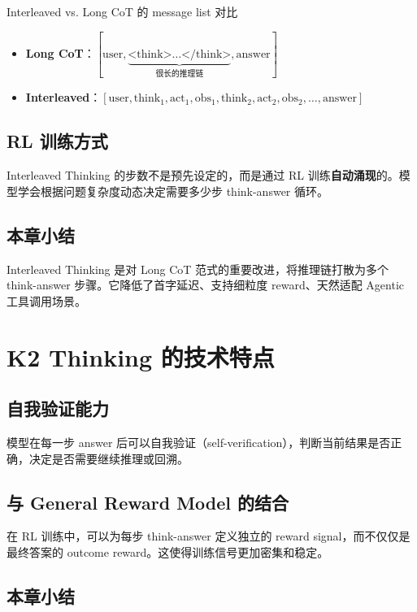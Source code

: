 \documentclass[a4paper]{article}
\begin{document}
\begin{knowledgebox}{Interleaved vs. Long CoT 的 message list 对比}
\begin{itemize}
  \item \textbf{Long CoT}：$[\text{user}, \underbrace{\text{<think>}\ldots\text{</think>}}_{\text{很长的推理链}}, \text{answer}]$
  \item \textbf{Interleaved}：$[\text{user}, \text{think}_1, \text{act}_1, \text{obs}_1, \text{think}_2, \text{act}_2, \text{obs}_2, \ldots, \text{answer}]$
\end{itemize}
\end{knowledgebox}

\subsection{RL 训练方式}

Interleaved Thinking 的步数不是预先设定的，而是通过 RL 训练\textbf{自动涌现}的。模型学会根据问题复杂度动态决定需要多少步 think-answer 循环。

\subsection{本章小结}

Interleaved Thinking 是对 Long CoT 范式的重要改进，将推理链打散为多个 think-answer 步骤。它降低了首字延迟、支持细粒度 reward、天然适配 Agentic 工具调用场景。

\section{K2 Thinking 的技术特点}

\subsection{自我验证能力}

模型在每一步 answer 后可以自我验证（self-verification），判断当前结果是否正确，决定是否需要继续推理或回溯。

\subsection{与 General Reward Model 的结合}

在 RL 训练中，可以为每步 think-answer 定义独立的 reward signal，而不仅仅是最终答案的 outcome reward。这使得训练信号更加密集和稳定。

\subsection{本章小结}
\end{document}
